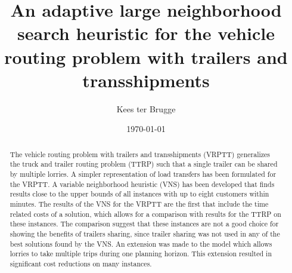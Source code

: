 \documentclass[a4paper]{article}
\title{An adaptive large neighborhood search heuristic for the vehicle routing problem with trailers and transshipments}
\author{Kees ter Brugge}
\date{\today}
\begin{document}
\setlength{\parindent}{0pt}
\maketitle


\begin{abstract}
The vehicle routing problem with trailers and transshipments (VRPTT) generalizes the truck and trailer routing problem (TTRP) such that a single trailer can be shared by multiple lorries.
A simpler representation of load transfers has been formulated for the VRPTT.
A variable neighborhood heuristic (VNS) has been developed that finds results close to the upper bounds of all instances with up to eight customers within minutes.
The results of the VNS for the VRPTT are the first that include the time related costs of a solution, which allows for a comparison with results for the TTRP on these instances.
The comparison suggest that these instances are not a good choice for showing the benefits of trailers sharing, since trailer sharing was not used in any of the best solutions found by the VNS.
An extension was made to the model which allows lorries to take multiple trips during one planning horizon.
This extension resulted in significant cost reductions on many instances.



\end{abstract}

\newpage
\tableofcontents

\newpage


\newpage


\newpage


\newpage


\newpage


\newpage


\newpage


\newpage


\end{document}

